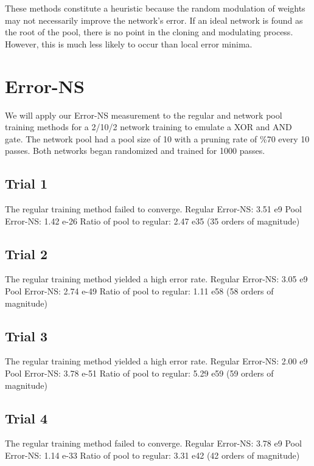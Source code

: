\documentclass[8pt]{amsart}
\begin{document}
These methods constitute a heuristic because the random modulation of weights
may not necessarily improve the network's error. If an ideal network is found
as the root of the pool, there is no point in the cloning and modulating process.
However, this is much less likely to occur than local error minima.

\section{Error-NS}

We will apply our Error-NS measurement to the regular and network pool training
methods for a 2/10/2 network training to emulate a XOR and AND gate. The network
pool had a pool size of 10 with a pruning rate of \%70 every 10 passes. Both
networks began randomized and trained for 1000 passes.

\subsection{Trial 1}

The regular training method failed to converge.
Regular Error-NS: 3.51 e9
Pool Error-NS: 1.42 e-26
Ratio of pool to regular: 2.47 e35 (35 orders of magnitude)

\subsection{Trial 2}

The regular training method yielded a high error rate.
Regular Error-NS: 3.05 e9
Pool Error-NS: 2.74 e-49
Ratio of pool to regular: 1.11 e58 (58 orders of magnitude)

\subsection{Trial 3}

The regular training method yielded a high error rate.
Regular Error-NS: 2.00 e9
Pool Error-NS: 3.78 e-51
Ratio of pool to regular: 5.29 e59 (59 orders of magnitude)

\subsection{Trial 4}

The regular training method failed to converge.
Regular Error-NS: 3.78 e9
Pool Error-NS: 1.14 e-33
Ratio of pool to regular: 3.31 e42 (42 orders of magnitude)
\end{document}
